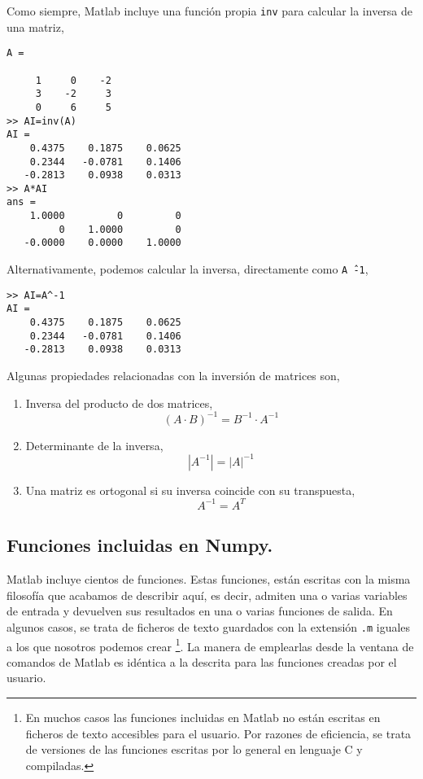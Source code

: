 Como siempre, Matlab incluye una función propia \texttt{inv} para calcular la inversa de una matriz,
\begin{verbatim}
A =

     1     0    -2
     3    -2     3
     0     6     5
>> AI=inv(A)
AI =
    0.4375    0.1875    0.0625
    0.2344   -0.0781    0.1406
   -0.2813    0.0938    0.0313
>> A*AI
ans =
    1.0000         0         0
         0    1.0000         0
   -0.0000    0.0000    1.0000
\end{verbatim}
 
Alternativamente, podemos calcular la inversa, directamente como \texttt{A\^\ -1},
\begin{verbatim}
>> AI=A^-1
AI =
    0.4375    0.1875    0.0625
    0.2344   -0.0781    0.1406
   -0.2813    0.0938    0.0313
\end{verbatim} 
Algunas propiedades relacionadas con la inversión de matrices son,
\begin{enumerate}
\item Inversa del producto de dos matrices,
\begin{equation*}
(A\cdot B)^{-1}=B^{-1}\cdot A^{-1}
\end{equation*}

\item Determinante de la inversa,
\begin{equation*}
\left\vert A^{-1} \right\vert = \vert A \vert ^{-1}
\end{equation*}

\item Una matriz es ortogonal si su inversa coincide con su transpuesta,
\begin{equation*}
A^{-1}=A^T
\end{equation*}
\end{enumerate}
\subsection{Funciones incluidas en Numpy.} 
Matlab incluye cientos de funciones. Estas funciones, están escritas con la misma filosofía que acabamos de describir aquí, es decir, admiten una o varias variables de entrada y devuelven sus resultados en una o varias funciones de salida. En algunos casos, se trata de ficheros de texto  guardados con la extensión \texttt{.m} iguales a los que nosotros podemos crear \footnote{En muchos casos las funciones incluidas en Matlab no están escritas en ficheros de texto accesibles para el usuario. Por razones de eficiencia, se trata de versiones de las funciones escritas por lo general en lenguaje C y compiladas.}. La manera de emplearlas desde la ventana de comandos de Matlab es idéntica a la descrita para las funciones creadas por el usuario. 

